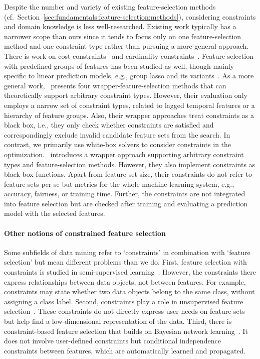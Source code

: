 Despite the number and variety of existing feature-selection methods (cf.~Section~\ref{sec:fundamentals:feature-selection:methods}), considering constraints and domain knowledge is less well-researched.
Existing work typically has a narrower scope than ours since it tends to focus only on one feature-selection method and one constraint type rather than pursuing a more general approach.
There is work on cost constraints~\cite{jagdhuber2020cost, momeni2021cafs, paclik2002feature, plasberg2009feature, zhang2016learning} and cardinality constraints~\cite{khushaba2011feature, lee2018effective, serpico2001new, yang2015budget}.
Feature selection with predefined groups of features has been studied as well, though mainly specific to linear prediction models, e.g., group lasso and its variants~\cite{friedman2010note, jacob2009group, simon2013sparse, yuan2006model, zhao2006grouped}.
As a more general work, \cite{groves2015toward}~presents four wrapper-feature-selection methods that can theoretically support arbitrary constraint types.
However, their evaluation only employs a narrow set of constraint types, related to lagged temporal features or a hierarchy of feature groups.
Also, their wrapper approaches treat constraints as a black box, i.e., they only check whether constraints are satisfied and correspondingly exclude invalid candidate feature sets from the search.
In contrast, we primarily use white-box solvers to consider constraints in the optimization.
\cite{neutatz2021enforcing}~introduces a wrapper approach supporting arbitrary constraint types and feature-selection methods.
However, they also implement constraints as black-box functions.
Apart from feature-set size, their constraints do not refer to feature sets per se but metrics for the whole machine-learning system, e.g., accuracy, fairness, or training time.
Further, the constraints are not integrated into feature selection but are checked after training and evaluating a prediction model with the selected features.

\paragraph{Other notions of constrained feature selection}

Some subfields of data mining refer to `constraints' in combination with `feature selection' but mean different problems than we do.
First, feature selection with constraints is studied in semi-supervised learning~\cite{hijazi2021active, rostami2020novel, sheikhpour2017survey, zhang2008constraint}.
However, the constraints there express relationships between data objects, not between features.
For example, constraints may state whether two data objects belong to the same class, without assigning a class label.
Second, constraints play a role in unsupervised feature selection~\cite{lu2018unsupervised, zhang2019nonlinear, zhang2020unsupervised}.
These constraints do not directly express user needs on feature sets but help find a low-dimensional representation of the data.
Third, there is constraint-based feature selection that builds on Bayesian network learning~\cite{lagani2017feature}.
It does not involve user-defined constraints but conditional independence constraints between features, which are automatically learned and propagated.

